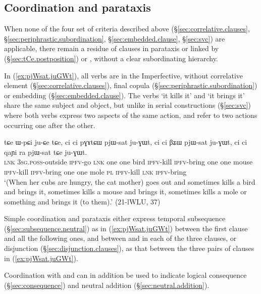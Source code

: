 \subsection{Coordination and parataxis} \label{sec:coordination}
When none of the four set of criteria described above (§\ref{sec:correlative.clauses}, §\ref{sec:periphrastic.subordination}, §\ref{sec:embedded.clause}, §\ref{sec:svc}) are applicable, there remain a residue of clauses in parataxis or linked by  (§\ref{sec:tCe.postposition}) or , without a clear subordinating hierarchy. 

In (\ref{ex:pjWsat.juGWt}), all verbs are in the Imperfective, without correlative element (§\ref{sec:correlative.clauses}), final copula (§\ref{sec:periphrastic.subordination}) or embedding (§\ref{sec:embedded.clause}). The verbs  `it kills it' and  `it brings it' share the same subject and object, but unlike in serial constructions (§\ref{sec:svc}) where both verbs express two aspects of the same action,  and  refer to two actions occurring one after the other.


\begin{exe}
\ex \label{ex:pjWsat.juGWt}
\gll tɕe ɯ-pɕi ju-ɕe tɕe, ci ci pɣɤtɕɯ pjɯ-sat ju-ɣɯt, ci ci βʑɯ pjɯ-sat ju-ɣɯt, ci ci qaɲi ra pjɯ-sat tɕe ju-ɣɯt. \\
\textsc{lnk} \textsc{3sg}.\textsc{poss}-outside \textsc{ipfv}-go \textsc{lnk} one one bird \textsc{ipfv}-kill \textsc{ipfv}-bring one one mouse \textsc{ipfv}-kill \textsc{ipfv}-bring one one mole \textsc{pl} \textsc{ipfv}-kill \textsc{lnk} \textsc{ipfv}-bring \\
\glt `(When her cubs are hungry, the cat mother) goes out and sometimes kills a bird and brings it, sometimes kills a mouse and brings it, sometimes kills a mole or something and brings it (to them).' (21-lWLU, 37)
\end{exe}

Simple coordination and parataxis either express temporal subsequence (§\ref{sec:subsequence.neutral}) as in (\ref{ex:pjWsat.juGWt}) between the first clause and all the following ones, and between  and  in each of the three clauses, or disjunction (§\ref{sec:disjunction.clauses}), as that between the three pairs of clauses in (\ref{ex:pjWsat.juGWt}). 

Coordination with  and  can in addition be used to indicate logical consequence (§\ref{sec:consequence}) and neutral addition (§\ref{sec:neutral.addition}).

